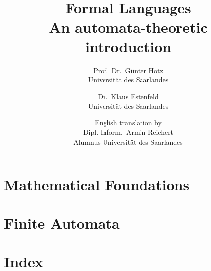 \documentclass[a4paper]{amsbook}
\title{Formal Languages\\An automata-theoretic introduction}
\author{Prof.\ Dr.\ Günter Hotz\\Universität des Saarlandes
\and Dr.\ Klaus Estenfeld\\Universität des Saarlandes
\and English translation by\\Dipl.-Inform.\ Armin Reichert\\Alumnus Universität
des Saarlandes}
\begin{document}
\maketitle

\tableofcontents


\chapter{Mathematical Foundations}







\chapter{Finite Automata}










\nocite{*}

\chapter*{Index}
\printindex
\end{document}
